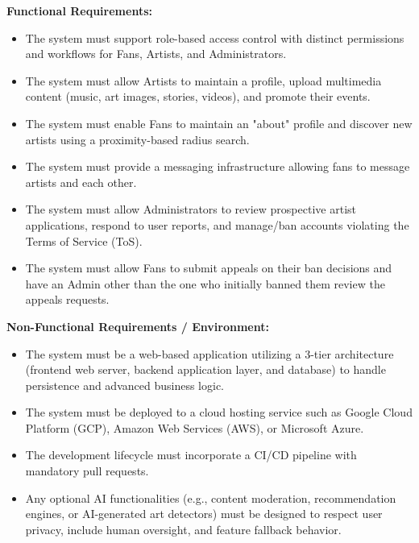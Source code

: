 \documentclass[11pt]{report}
\newcommand{\fillin}[1]{\textcolor{gray!70}{\emph{[#1]}}}
\begin{document}
\textbf{Functional Requirements:}
\begin{itemize}
  \item The system must support role-based access control with distinct permissions and workflows for Fans, Artists, and Administrators.
  \item The system must allow Artists to maintain a profile, upload multimedia content (music, art images, stories, videos), and promote their events.
  \item The system must enable Fans to maintain an "about" profile and discover new artists using a proximity-based radius search.
  \item The system must provide a messaging infrastructure allowing fans to message artists and each other.
  \item The system must allow Administrators to review prospective artist applications, respond to user reports, and manage/ban accounts violating the Terms of Service (ToS).
  \item The system must allow Fans to submit appeals on their ban decisions and have an Admin other than the one who initially banned them review the appeals requests.
\end{itemize}

\textbf{Non-Functional Requirements / Environment:}
\begin{itemize}
  \item The system must be a web-based application utilizing a 3-tier architecture (frontend web server, backend application layer, and database) to handle persistence and advanced business logic.
  \item The system must be deployed to a cloud hosting service such as Google Cloud Platform (GCP), Amazon Web Services (AWS), or Microsoft Azure.
  \item The development lifecycle must incorporate a CI/CD pipeline with mandatory pull requests.
  \item Any optional AI functionalities (e.g., content moderation, recommendation engines, or AI-generated art detectors) must be designed to respect user privacy, include human oversight, and feature fallback behavior.
\end{itemize}

\end{document}
